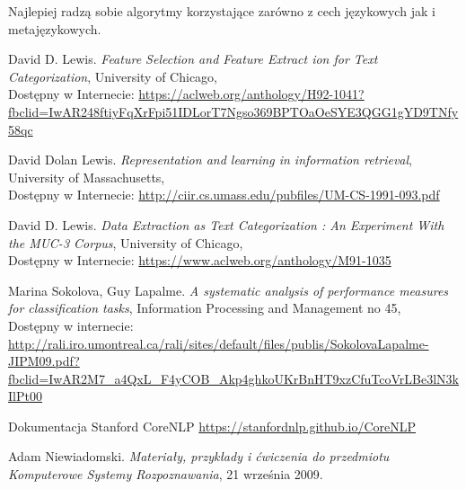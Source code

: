 \documentclass{classrep}
\begin{document}
	Najlepiej radzą sobie algorytmy korzystające zarówno z cech językowych jak i metajęzykowych.

\begin{thebibliography}{0}
   David D. Lewis.
  	\textsl{Feature Selection and Feature Extract ion for Text Categorization}, University of Chicago,\\
  	Dostępny w Internecie: \url {https://aclweb.org/anthology/H92-1041?fbclid=IwAR248ftiyFqXrFpi51IDLorT7Ngso369BPTOaOeSYE3QGG1gYD9TNfy58qc}

   David Dolan Lewis.
  	\textsl{Representation and learning in information retrieval}, University of Massachusetts,\\
  	Dostępny w Internecie: \url {http://ciir.cs.umass.edu/pubfiles/UM-CS-1991-093.pdf}

   David D. Lewis.
  	\textsl{Data Extraction as Text Categorization : An
Experiment With the MUC-3 Corpus}, University of Chicago,\\
	Dostępny w Internecie: \url {https://www.aclweb.org/anthology/M91-1035}

   Marina Sokolova, Guy Lapalme.
  	\textsl{A systematic analysis of performance measures for classification tasks}, Information Processing and Management no 45,\\
  	Dostępny w internecie: \url {http://rali.iro.umontreal.ca/rali/sites/default/files/publis/SokolovaLapalme-JIPM09.pdf?fbclid=IwAR2M7_a4QxL_F4yCOB_Akp4ghkoUKrBnHT9xzCfuTcoVrLBe3lN3kIlPt00}

   Dokumentacja Stanford CoreNLP
    \url {https://stanfordnlp.github.io/CoreNLP}
    
   Adam Niewiadomski.
  	\textsl{Materiały, przykłady i ćwiczenia do przedmiotu
Komputerowe Systemy Rozpoznawania}, 21 września 2009.\\

\end{thebibliography}
\end{document}
